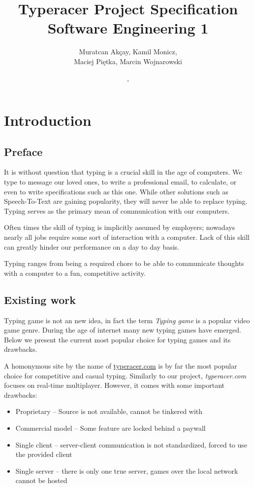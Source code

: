 \documentclass[titlepage]{article}
\title{Typeracer Project Specification \\ \large Software Engineering 1}
\author{Muratcan Akçay, Kamil Monicz,\\ Maciej Piętka, Marcin Wojnarowski}
\date{\monthname, \the\year}
\begin{document}
\maketitle

\tableofcontents
\newpage

\section{Introduction}

\subsection{Preface}

It is without question that typing is a crucial skill in the age of computers. We type to message our loved ones, to write a professional email, to calculate, or even to write specifications such as this one. While other solutions such as Speech-To-Text are gaining popularity, they will never be able to replace typing. Typing serves as the primary mean of communication with our computers.

Often times the skill of typing is implicitly assumed by employers; nowadays nearly all jobs require some sort of interaction with a computer. Lack of this skill can greatly hinder our performance on a day to day basis.

Typing ranges from being a required chore to be able to communicate thoughts with a computer to a fun, competitive activity.

\subsection{Existing work}

Typing game is not an new idea, in fact the term {\it Typing game} is a popular video game genre. During the age of internet many new typing games have emerged. Below we present the current most popular choice for typing games and its drawbacks.

A homonymous site by the name of \url{typeracer.com} is by far the most popular choice for competitive and casual typing. Similarly to our project, {\it typeracer.com} focuses on real-time multiplayer. However, it comes with some important drawbacks:

\begin{itemize}
	\item Proprietary -- Source is not available, cannot be tinkered with

	\item Commercial model -- Some feature are locked behind a paywall

	\item Single client -- server-client communication is not standardized, forced to use the provided client

	\item Single server -- there is only one true server, games over the local network cannot be hosted
\end{itemize}
\end{document}
